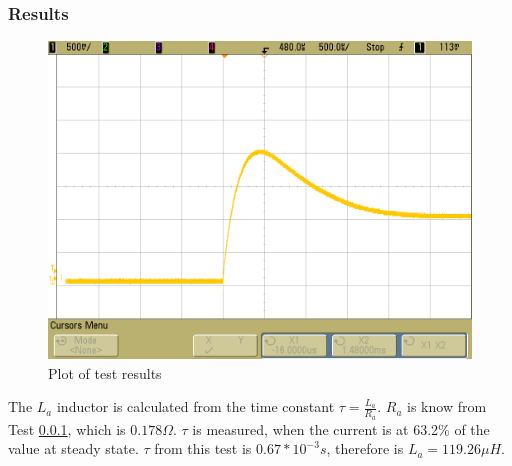\subsubsection{Results}

\begin{figure}[H]
	\centering
	\includegraphics[scale=.4]{figures/Exercise2}
	\caption{Plot of test results}
\end{figure}

The $L_a$ inductor is calculated from the time constant $\tau = \frac{L_a}{R_a}$. $R_a$ is know from Test \ref{}, which is $0.178 \Omega$. $\tau$ is measured, when the current is at 63.2\% of the value at steady state. $\tau$ from this test is $0.67 * 10^{-3} s$, therefore is $L_a = 119.26 \mu H$.
